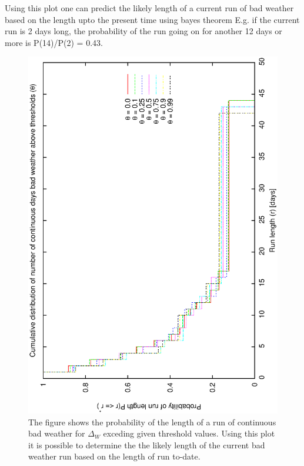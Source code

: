 {{Using this plot one can predict the likely length of a current run of bad weather based on the length upto the present time using bayes theorem E.g. if the current run is 2 days long, the probability of the run going on for another 12 days or more is P(14)/P(2) = 0.43.


\begin{figure}[htbp]
\begin{center}
    \includegraphics[scale=0.4, angle=-90]{figures/ecs/run_len_thresh.eps}
\end{center}
\caption[Cumulative probability of lengths of bad weather runs.]
{The figure shows the probability of the length of a run of continuous bad weather for $\Delta_W$ exceding given threshold values. Using this plot it is possible to determine the the likely length of the current bad weather run based on the length of run to-date.}
\label{fig:ecs_run_len}
\end{figure}



}}
